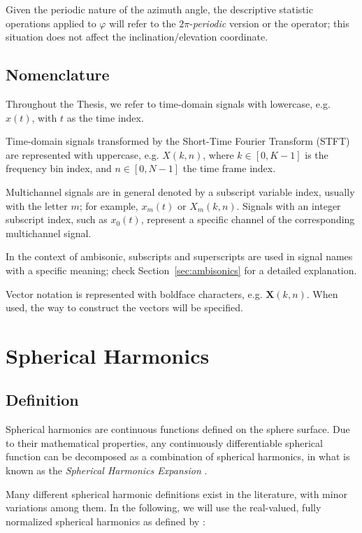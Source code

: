 Given the periodic nature of the azimuth angle, the descriptive statistic operations applied to $\varphi$ will refer to the $2\pi$-\textit{periodic} version or the operator; this situation does not affect the inclination/elevation coordinate.


\subsection{Nomenclature}

Throughout the Thesis, we refer to time-domain signals with lowercase, e.g. $x(t)$, with $t$ as the time index. 

Time-domain signals transformed by the Short-Time Fourier Transform (STFT) are represented with uppercase, e.g. $X(k,n)$, where $k \in [0, K-1]$ is the frequency bin index, and $n \in [0, N-1]$ the time frame index. 

Multichannel signals are in general denoted by a subscript variable index, usually with the letter $m$; for example, $x_m(t)$ or $X_m(k,n)$.
Signals with an integer subscript index, such as $x_0(t)$, represent a specific channel of the corresponding multichannel signal.

In the context of ambisonic, subscripts and superscripts are used in signal names with a specific meaning; check Section~\ref{sec:ambisonics} for a detailed explanation.

Vector notation is represented with boldface characters, e.g. $\bm{X}(k,n)$.  When used, the way to construct the vectors will be specified. 



\section{Spherical Harmonics}

\subsection{Definition}

Spherical harmonics are continuous functions defined on the sphere surface. Due to their mathematical properties, any continuously differentiable spherical function can be decomposed as a combination of spherical harmonics, in what is known as the \textit{Spherical Harmonics Expansion} \cite{jarrett2017theory}.




Many different spherical harmonic definitions exist in the literature, with minor variations among them. In the following, we will use the real-valued, fully normalized spherical harmonics as defined by \cite{zotter2019ambisonics}: 

